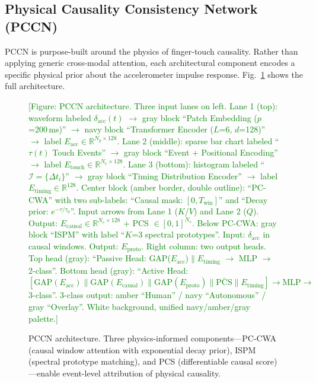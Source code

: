 \subsection{Physical Causality Consistency Network (PCCN)}
\label{sec:pccn}

PCCN is purpose-built around the physics of finger-touch causality.%
Rather than applying generic cross-modal attention, each architectural component encodes
a specific physical prior about the accelerometer impulse response.%
Fig.~\ref{fig:pccn} shows the full architecture.%

\begin{figure}[t]
  \centering
  \textcolor{green}{[Figure: PCCN architecture. Three input lanes on left.
  Lane 1 (top): waveform labeled $\delta_{\mathrm{acc}}(t)$
    $\rightarrow$ gray block ``Patch Embedding ($p$=200\,ms)''
    $\rightarrow$ navy block ``Transformer Encoder ($L$=6, $d$=128)''
    $\rightarrow$ label $E_{\mathrm{acc}} \in \mathbb{R}^{N_p \times 128}$.
  Lane 2 (middle): sparse bar chart labeled ``$\tau(t)$ Touch Events''
    $\rightarrow$ gray block ``Event + Positional Encoding''
    $\rightarrow$ label $E_{\mathrm{touch}} \in \mathbb{R}^{N_e \times 128}$.
  Lane 3 (bottom): histogram labeled ``$\mathcal{I}=\{\Delta t_i\}$''
    $\rightarrow$ gray block ``Timing Distribution Encoder''
    $\rightarrow$ label $E_{\mathrm{timing}} \in \mathbb{R}^{128}$.
  Center block (amber border, double outline): ``PC-CWA'' with two sub-labels:
    ``Causal mask: $[0, T_{\mathrm{win}}]$'' and ``Decay prior: $e^{-\tau/\tau_0}$''.
    Input arrows from Lane 1 ($K$/$V$) and Lane 2 ($Q$).
    Output: $E_{\mathrm{causal}} \in \mathbb{R}^{N_e \times 128}$ + PCS $\in [0,1]^{N_e}$.
  Below PC-CWA: gray block ``ISPM'' with label ``$K$=3 spectral prototypes''.
    Input: $\delta_{\mathrm{acc}}$ in causal windows. Output: $E_{\mathrm{proto}}$.
  Right column: two output heads.
    Top head (gray): ``Passive Head: GAP($E_{\mathrm{acc}}$)$\|E_{\mathrm{timing}}$ $\rightarrow$ MLP $\rightarrow$ 2-class''.
    Bottom head (gray): ``Active Head:
      $[\mathrm{GAP}(E_{\mathrm{acc}}) \| \mathrm{GAP}(E_{\mathrm{causal}}) \|
       \mathrm{GAP}(E_{\mathrm{proto}}) \| \bar{\mathrm{PCS}} \| E_{\mathrm{timing}}]
       \rightarrow \mathrm{MLP} \rightarrow$ 3-class''.
    3-class output: amber ``Human'' / navy ``Autonomous'' / gray ``Overlay''.
  White background, unified navy/amber/gray palette.]}
  \caption{PCCN architecture. Three physics-informed components---PC-CWA (causal window
  attention with exponential decay prior), ISPM (spectral prototype matching), and PCS
  (differentiable causal score)---enable event-level attribution of physical causality.}
  \label{fig:pccn}
\end{figure}

